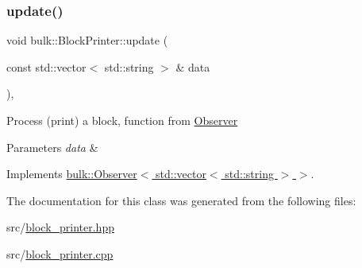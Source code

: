 \subsubsection{\texorpdfstring{update()}{update()}}
{\footnotesize\ttfamily void bulk\+::\+Block\+Printer\+::update (\begin{DoxyParamCaption}\item[{const std\+::vector$<$ std\+::string $>$ \&}]{data }\end{DoxyParamCaption})\hspace{0.3cm}{\ttfamily [override]}, {\ttfamily [virtual]}}

Process (print) a block, function from \hyperlink{classbulk_1_1Observer}{Observer} 
\begin{DoxyParams}{Parameters}
{\em data} & \\
\hline
\end{DoxyParams}


Implements \hyperlink{classbulk_1_1Observer_af17104660bf8b287e467213c4efbee2e}{bulk\+::\+Observer$<$ std\+::vector$<$ std\+::string $>$ $>$}.



The documentation for this class was generated from the following files\+:\begin{DoxyCompactItemize}
\item 
src/\hyperlink{block__printer_8hpp}{block\+\_\+printer.\+hpp}\item 
src/\hyperlink{block__printer_8cpp}{block\+\_\+printer.\+cpp}\end{DoxyCompactItemize}
